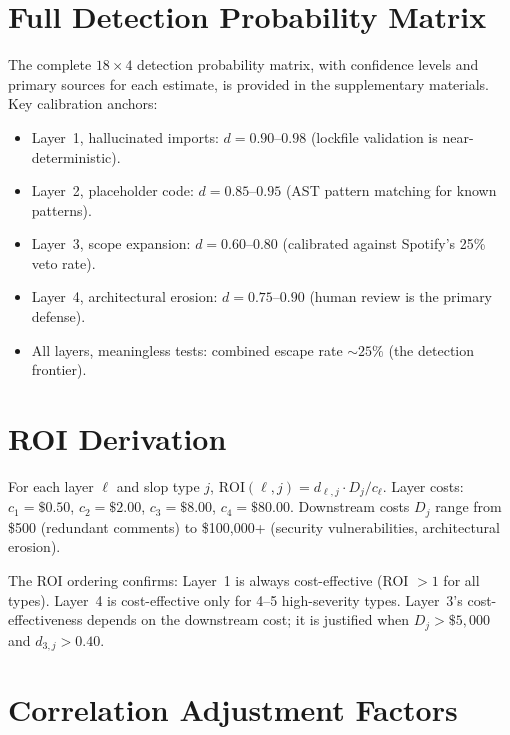 \documentclass[11pt, a4paper, logo, copyright]{googledeepmind}
\newcommand{\ROI}{\mathrm{ROI}}
\begin{document}
\begin{appendices}

\section{Full Detection Probability Matrix}
\label{app:matrix}

The complete $18 \times 4$ detection probability matrix, with confidence levels and primary sources for each estimate, is provided in the supplementary materials. Key calibration anchors:

\begin{itemize}
\item Layer~1, hallucinated imports: $d = 0.90$--$0.98$ (lockfile validation is near-deterministic).
\item Layer~2, placeholder code: $d = 0.85$--$0.95$ (AST pattern matching for known patterns).
\item Layer~3, scope expansion: $d = 0.60$--$0.80$ (calibrated against Spotify's 25\% veto rate).
\item Layer~4, architectural erosion: $d = 0.75$--$0.90$ (human review is the primary defense).
\item All layers, meaningless tests: combined escape rate ${\sim}25\%$ (the detection frontier).
\end{itemize}

\section{ROI Derivation}
\label{app:roi}

For each layer $\ell$ and slop type $j$, $\ROI(\ell, j) = d_{\ell,j} \cdot D_j / c_\ell$. Layer costs: $c_1 = \$0.50$, $c_2 = \$2.00$, $c_3 = \$8.00$, $c_4 = \$80.00$. Downstream costs $D_j$ range from \$500 (redundant comments) to \$100,000+ (security vulnerabilities, architectural erosion).

The ROI ordering confirms: Layer~1 is always cost-effective (ROI $> 1$ for all types). Layer~4 is cost-effective only for 4--5 high-severity types. Layer~3's cost-effectiveness depends on the downstream cost; it is justified when $D_j > \$5{,}000$ and $d_{3,j} > 0.40$.

\section{Correlation Adjustment Factors}
\label{app:correlation}


\end{appendices}
\end{document}
